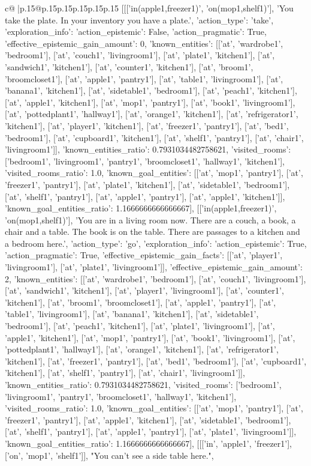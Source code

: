 \documentclass{article}
\begin{document}
{\begin{supertabular}{c@{$\;$}|p{.15\linewidth}@{}p{.15\linewidth}p{.15\linewidth}p{.15\linewidth}p{.15\linewidth}p{.15\linewidth}}
{{{	 [[['in(apple1,freezer1)', 'on(mop1,shelf1)'], 'You take the plate. In your inventory you have a plate.', {'action_type': 'take', 'exploration_info': {'action_epistemic': False, 'action_pragmatic': True, 'effective_epistemic_gain_amount': 0, 'known_entities': [['at', 'wardrobe1', 'bedroom1'], ['at', 'couch1', 'livingroom1'], ['at', 'plate1', 'kitchen1'], ['at', 'sandwich1', 'kitchen1'], ['at', 'counter1', 'kitchen1'], ['at', 'broom1', 'broomcloset1'], ['at', 'apple1', 'pantry1'], ['at', 'table1', 'livingroom1'], ['at', 'banana1', 'kitchen1'], ['at', 'sidetable1', 'bedroom1'], ['at', 'peach1', 'kitchen1'], ['at', 'apple1', 'kitchen1'], ['at', 'mop1', 'pantry1'], ['at', 'book1', 'livingroom1'], ['at', 'pottedplant1', 'hallway1'], ['at', 'orange1', 'kitchen1'], ['at', 'refrigerator1', 'kitchen1'], ['at', 'player1', 'kitchen1'], ['at', 'freezer1', 'pantry1'], ['at', 'bed1', 'bedroom1'], ['at', 'cupboard1', 'kitchen1'], ['at', 'shelf1', 'pantry1'], ['at', 'chair1', 'livingroom1']], 'known_entities_ratio': 0.7931034482758621, 'visited_rooms': ['bedroom1', 'livingroom1', 'pantry1', 'broomcloset1', 'hallway1', 'kitchen1'], 'visited_rooms_ratio': 1.0, 'known_goal_entities': [['at', 'mop1', 'pantry1'], ['at', 'freezer1', 'pantry1'], ['at', 'plate1', 'kitchen1'], ['at', 'sidetable1', 'bedroom1'], ['at', 'shelf1', 'pantry1'], ['at', 'apple1', 'pantry1'], ['at', 'apple1', 'kitchen1']], 'known_goal_entities_ratio': 1.1666666666666667}}], [['in(apple1,freezer1)', 'on(mop1,shelf1)'], 'You are in a living room now. There are a couch, a book, a chair and a table. The book is on the table. There are passages to a kitchen and a bedroom here.', {'action_type': 'go', 'exploration_info': {'action_epistemic': True, 'action_pragmatic': True, 'effective_epistemic_gain_facts': [['at', 'player1', 'livingroom1'], ['at', 'plate1', 'livingroom1']], 'effective_epistemic_gain_amount': 2, 'known_entities': [['at', 'wardrobe1', 'bedroom1'], ['at', 'couch1', 'livingroom1'], ['at', 'sandwich1', 'kitchen1'], ['at', 'player1', 'livingroom1'], ['at', 'counter1', 'kitchen1'], ['at', 'broom1', 'broomcloset1'], ['at', 'apple1', 'pantry1'], ['at', 'table1', 'livingroom1'], ['at', 'banana1', 'kitchen1'], ['at', 'sidetable1', 'bedroom1'], ['at', 'peach1', 'kitchen1'], ['at', 'plate1', 'livingroom1'], ['at', 'apple1', 'kitchen1'], ['at', 'mop1', 'pantry1'], ['at', 'book1', 'livingroom1'], ['at', 'pottedplant1', 'hallway1'], ['at', 'orange1', 'kitchen1'], ['at', 'refrigerator1', 'kitchen1'], ['at', 'freezer1', 'pantry1'], ['at', 'bed1', 'bedroom1'], ['at', 'cupboard1', 'kitchen1'], ['at', 'shelf1', 'pantry1'], ['at', 'chair1', 'livingroom1']], 'known_entities_ratio': 0.7931034482758621, 'visited_rooms': ['bedroom1', 'livingroom1', 'pantry1', 'broomcloset1', 'hallway1', 'kitchen1'], 'visited_rooms_ratio': 1.0, 'known_goal_entities': [['at', 'mop1', 'pantry1'], ['at', 'freezer1', 'pantry1'], ['at', 'apple1', 'kitchen1'], ['at', 'sidetable1', 'bedroom1'], ['at', 'shelf1', 'pantry1'], ['at', 'apple1', 'pantry1'], ['at', 'plate1', 'livingroom1']], 'known_goal_entities_ratio': 1.1666666666666667}}], [[['in', 'apple1', 'freezer1'], ['on', 'mop1', 'shelf1']], "You can't see a side table here.", }}}
\end{supertabular}}
\end{document}
